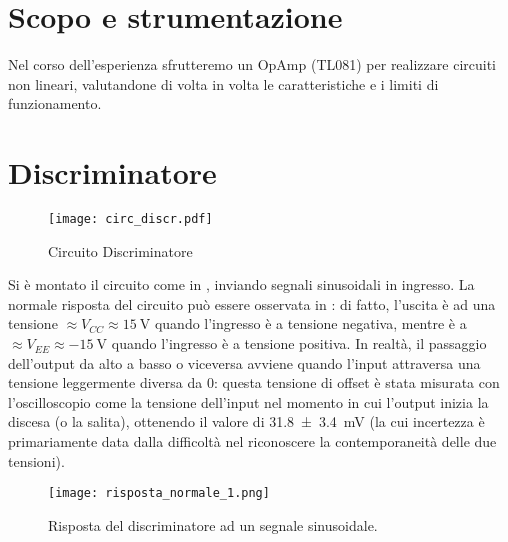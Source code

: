 \section{Scopo e strumentazione}

Nel corso dell'esperienza sfrutteremo un OpAmp (TL081) per realizzare circuiti non lineari, valutandone di volta in volta le caratteristiche e i limiti di funzionamento.

\section{Discriminatore}

\begin{figure}[h]
	\centering
	\texttt{[image: circ\_discr.pdf]}
	\caption{Circuito Discriminatore}
	\label{f:discr}
\end{figure}

Si è montato il circuito come in , inviando segnali sinusoidali in ingresso. La normale risposta del circuito può essere osservata in : di fatto, l'uscita è ad una tensione $\approx V_{CC} \approx \SI{15}{\V}$ quando l'ingresso è a tensione negativa, mentre è a $\approx V_{EE} \approx \SI{-15}{\V}$ quando l'ingresso è a tensione positiva. In realtà, il passaggio dell'output da alto a basso o viceversa avviene quando l'input attraversa una tensione leggermente diversa da 0: questa tensione di offset è stata misurata con l'oscilloscopio come la tensione dell'input nel momento in cui l'output inizia la discesa (o la salita), ottenendo il valore di \SI{31.8(34)}{\mV} (la cui incertezza è primariamente data dalla difficoltà nel riconoscere la contemporaneità delle due tensioni).

\begin{figure}[h]
	\centering
	\texttt{[image: risposta\_normale\_1.png]}
	\caption{Risposta del discriminatore ad un segnale sinusoidale.}
	\label{f:discr_normale}
\end{figure}


